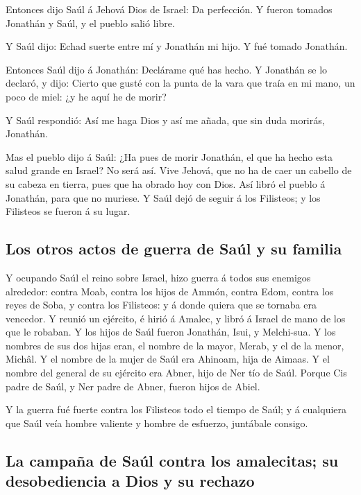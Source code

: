  Entonces dijo Saúl á Jehová Dios de Israel: Da
perfección. Y fueron tomados Jonathán y Saúl, y el pueblo salió libre.

 Y Saúl dijo: Echad suerte entre mí y Jonathán mi hijo. Y
fué tomado Jonathán.

 Entonces Saúl dijo á Jonathán: Declárame qué has hecho.
Y Jonathán se lo declaró, y dijo: Cierto que gusté con la punta de la
vara que traía en mi mano, un poco de miel: ¿y he aquí he de morir?

 Y Saúl respondió: Así me haga Dios y así me añada, que
sin duda morirás, Jonathán.

 Mas el pueblo dijo á Saúl: ¿Ha pues de morir Jonathán,
el que ha hecho esta salud grande en Israel? No será así. Vive Jehová,
que no ha de caer un cabello de su cabeza en tierra, pues que ha obrado
hoy con Dios. Así libró el pueblo á Jonathán, para que no muriese.
 Y Saúl dejó de seguir á los Filisteos; y los Filisteos
se fueron á su lugar.

\hypertarget{los-otros-actos-de-guerra-de-sauxfal-y-su-familia}{%
\subsection{Los otros actos de guerra de Saúl y su
familia}\label{los-otros-actos-de-guerra-de-sauxfal-y-su-familia}}

 Y ocupando Saúl el reino sobre Israel, hizo guerra á
todos sus enemigos alrededor: contra Moab, contra los hijos de Ammón,
contra Edom, contra los reyes de Soba, y contra los Filisteos: y á donde
quiera que se tornaba era vencedor.  Y reunió un
ejército, é hirió á Amalec, y libró á Israel de mano de los que le
robaban.  Y los hijos de Saúl fueron Jonathán, Isui, y
Melchi-sua. Y los nombres de sus dos hijas eran, el nombre de la mayor,
Merab, y el de la menor, Michâl.  Y el nombre de la mujer
de Saúl era Ahinoam, hija de Aimaas. Y el nombre del general de su
ejército era Abner, hijo de Ner tío de Saúl.  Porque Cis
padre de Saúl, y Ner padre de Abner, fueron hijos de Abiel.

 Y la guerra fué fuerte contra los Filisteos todo el
tiempo de Saúl; y á cualquiera que Saúl veía hombre valiente y hombre de
esfuerzo, juntábale consigo.

\hypertarget{la-campauxf1a-de-sauxfal-contra-los-amalecitas-su-desobediencia-a-dios-y-su-rechazo}{%
\subsection{La campaña de Saúl contra los amalecitas; su desobediencia a
Dios y su
rechazo}\label{la-campauxf1a-de-sauxfal-contra-los-amalecitas-su-desobediencia-a-dios-y-su-rechazo}}

